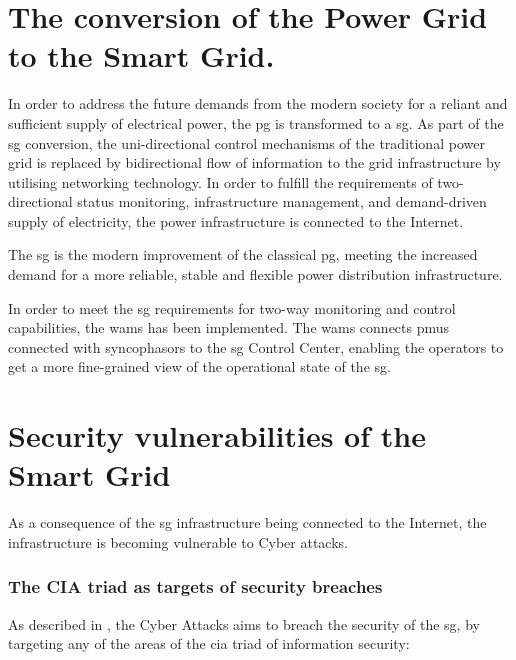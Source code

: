 \section{The conversion of the Power Grid to the Smart Grid.}




In order to address the future demands from the modern society for a reliant and sufficient supply of electrical power, the \acrshort{pg} is transformed  to a \acrshort{sg}. As part of the \acrshort{sg} conversion, the uni-directional control mechanisms of the traditional power grid is replaced by bidirectional flow of information to the grid infrastructure by utilising networking technology.  In order to fulfill the requirements of two-directional status monitoring, infrastructure management, and demand-driven supply of electricity, the power infrastructure is connected to the Internet. 

The \acrfull{sg} is the modern improvement of the classical \acrfull{pg}, meeting the increased demand for a more reliable, stable and flexible power distribution infrastructure.

In order to meet the \acrfull{sg} requirements for two-way monitoring  and control capabilities, the \acrfull{wams} has been implemented.
The \acrshort{wams} connects \acrlong{pmu}s connected with syncophasors to the \acrshort{sg} Control Center, enabling the operators to get a more fine-grained view of the operational state of the \acrshort{sg}.








\section{Security vulnerabilities of the Smart Grid}

As a consequence of the \acrshort{sg} infrastructure being connected to the Internet, the infrastructure is becoming vulnerable to Cyber attacks.   
\subsubsection{The CIA triad  as targets of security breaches}
As described in \cite{rawat2015cyber}, the Cyber Attacks aims to breach the security of the \acrlong{sg}, by targeting any of the areas of  the
\acrfull{cia} triad of information security:

